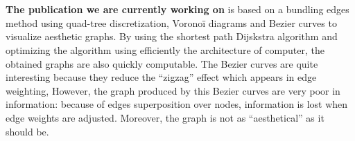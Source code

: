 \\
\\
\textbf{The publication we are currently working on} is based on a bundling edges method using quad-tree discretization, Voronoï diagrams and Bezier curves to visualize aesthetic graphs. By using the shortest path Dijskstra  algorithm and optimizing the algorithm using efficiently the architecture of computer, the obtained graphs are also quickly computable. The Bezier curves are quite interesting because they reduce the “zigzag” effect which appears in edge weighting, However, the graph produced by this Bezier curves are very poor in information: because of edges superposition over nodes, information is lost when edge weights are adjusted. Moreover, the graph is not as “aesthetical” as it should be.
